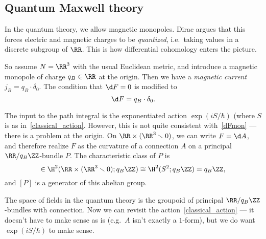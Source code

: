 
\subsection{Quantum Maxwell theory}
\label{quantum_Maxwell}

In the quantum theory, we allow magnetic monopoles. Dirac \cite{Dir31} argues that this forces electric and
magnetic charges to be \emph{quantized}, i.e.\ taking values in a discrete subgroup of $\RR$. This is how
differential cohomology enters the picture.

So assume $N = \RR^3$ with the usual Euclidean metric, and introduce a magnetic monopole of charge $q_B\in\RR$ at
the origin. Then we have a \emph{magnetic current}  $j_B = q_B\cdot\delta_0$.
The condition that $\d F = 0$ is modified to
\begin{equation}
\label{dFmon}
	\d F = q_B\cdot\delta_0.
\end{equation}

The input to the path integral is the exponentiated action $\exp(iS/\hbar)$ (where $S$ is
as in~\eqref{classical_action}. However, this is not quite consistent with~\eqref{dFmon} --- there is a problem at
the origin. On $\RR\times(\RR^3\smallsetminus 0)$, we can write $F = \d A$, and therefore realize $F$ as the curvature of
a connection $A$ on a principal $\RR/q_B\ZZ$-bundle $P$. The characteristic class of $P$ is
\begin{equation}
	[P]\in \H^2(\RR\times (\RR^3\smallsetminus 0); q_B\ZZ)\cong \H^2(S^2;q_B\ZZ) = q_B\ZZ,
\end{equation}
and $[P]$ is a generator of this abelian group.

The space of fields in the quantum theory is the groupoid of principal $\RR/q_B\ZZ$-bundles with connection. Now we
can revisit the action~\eqref{classical_action} --- it doesn't have to make sense as is (e.g.\ $A$ isn't exactly a
$1$-form), but we do want $\exp(iS/\hbar)$ to make sense.

